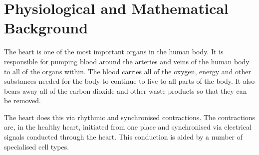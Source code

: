 \chapter{Physiological and Mathematical Background}

The heart is one of the most important organs in the human body.
It is responsible for pumping blood around the arteries and veins of the human
body to all of the organs within.
The blood carries all of the oxygen, energy and other substances needed for the
body to continue to live to all parts of the body.
It also bears away all of the carbon dioxide and other waste products so that
they can be removed.

The heart does this via rhythmic and synchronised contractions.
The contractions are, in the healthy heart, initiated from one place and
synchronised via electrical signals conducted through the heart.
This conduction is aided by a number of specialised cell types.






